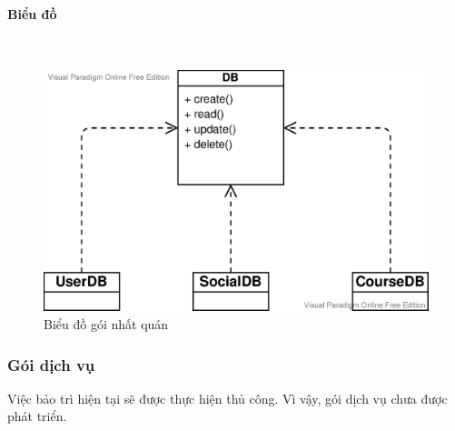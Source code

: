 \documentclass[./../main_file.tex]{subfiles}
\begin{document}
	\paragraph{Biểu đồ}~\\
		\begin{figure}[H]
		\centering
				\includegraphics[width=\linewidth]{./images/PackagePersistence_LogicalView.eps}
		\caption{Biểu đồ gói nhất quán}
	\end{figure}
	\subsubsection{Gói dịch vụ}
	Việc bảo trì hiện tại sẽ được thực hiện thủ công. Vì vậy, gói dịch vụ chưa được phát triển.
	
\end{document}
